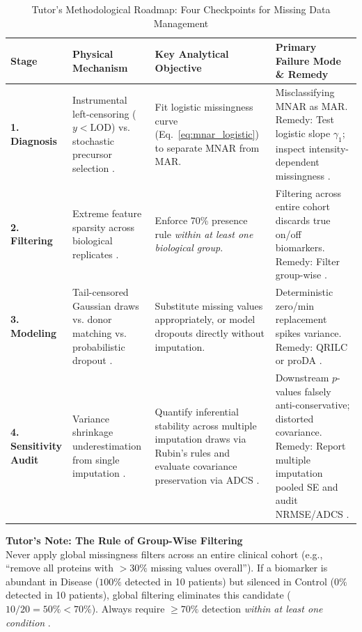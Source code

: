 \documentclass[11pt,oneside]{book}
\begin{document}
\begin{table}[htbp]
\centering
\caption{Tutor's Methodological Roadmap: Four Checkpoints for Missing Data Management}
\label{tab:missing_roadmap}
\small
\begin{tabularx}{\textwidth}{l p{3.8cm} p{4.2cm} X}
\toprule
\textbf{Stage} & \textbf{Physical Mechanism} & \textbf{Key Analytical Objective} & \textbf{Primary Failure Mode \& Remedy} \\
\midrule
\textbf{1. Diagnosis} & Instrumental left-censoring ($y < \text{LOD}$) vs. stochastic precursor selection \cite{rubin1976inference, lazar2016accounting}. & Fit logistic missingness curve (Eq.~\ref{eq:mnar_logistic}) to separate MNAR from MAR. & Misclassifying MNAR as MAR. Remedy: Test logistic slope $\gamma_1$; inspect intensity-dependent missingness \cite{ahlmann2020proda}. \\
\addlinespace
\textbf{2. Filtering} & Extreme feature sparsity across biological replicates \cite{webb2020review, karpievitch2012normalization}. & Enforce 70\% presence rule \textit{within at least one biological group}. & Filtering across entire cohort discards true on/off biomarkers. Remedy: Filter group-wise \cite{zhang2018dep}. \\
\addlinespace
\textbf{3. Modeling} & Tail-censored Gaussian draws vs. donor matching vs. probabilistic dropout \cite{tyanova2016perseus, ahlmann2020proda, palstrom2020imputation}. & Substitute missing values appropriately, or model dropouts directly without imputation. & Deterministic zero/min replacement spikes variance. Remedy: QRILC or proDA \cite{ahlmann2020proda}. \\
\addlinespace
\textbf{4. Sensitivity Audit} & Variance shrinkage underestimation from single imputation \cite{rubin1987multiple, little2019statistical}. & Quantify inferential stability across multiple imputation draws via Rubin's rules and evaluate covariance preservation via ADCS \cite{templ2023visualization}. & Downstream $p$-values falsely anti-conservative; distorted covariance. Remedy: Report multiple imputation pooled SE \cite{barnard1999small, vanbuuren2018} and audit NRMSE/ADCS \cite{templ2023visualization}. \\
\bottomrule
\end{tabularx}
\end{table}

\begin{notebox}
\textbf{Tutor's Note: The Rule of Group-Wise Filtering}\\
Never apply global missingness filters across an entire clinical cohort (e.g., ``remove all proteins with $>30\%$ missing values overall''). If a biomarker is abundant in Disease ($100\%$ detected in 10 patients) but silenced in Control ($0\%$ detected in 10 patients), global filtering eliminates this candidate ($10/20 = 50\% < 70\%$). Always require $\ge 70\%$ detection \textit{within at least one condition} \cite{zhang2018dep, webb2020review}.
\end{notebox}
\end{document}
